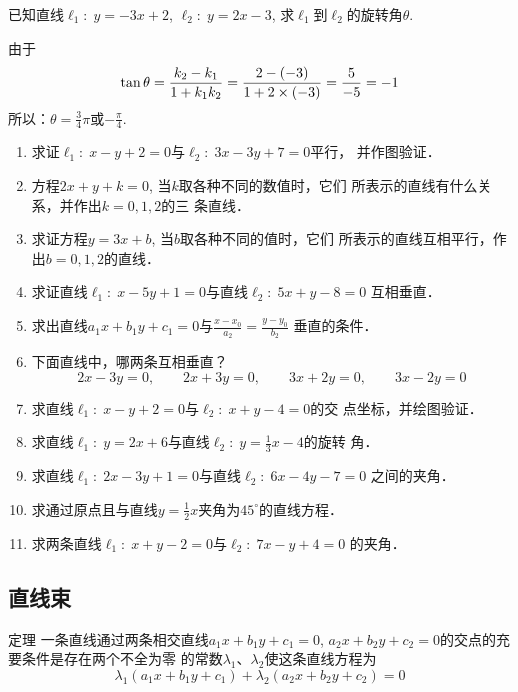 \begin{example}
    已知直线$\ell_1:\; y=-3x+2$, $\ell_2:\; y=2x-3$, 
求$\ell_1$到$\ell_2$的旋转角$\theta$.
\end{example}

\begin{solution}
由于
\[\tan\theta=\dfrac{k_2-k_1}{1+k_1k_2}=\dfrac{2-(-3)}{1+2\times (-3)}=\dfrac{5}{-5}=-1\]
所以：$\theta=\frac{3}{4}\pi$或$-\frac{\pi}{4}$.
\end{solution}

\begin{ex}
\begin{enumerate}
    \item 求证$\ell_1:\; x-y+2=0$与$\ell_2:\;3x-3y+7=0$平行，
    并作图验证．
    \item 方程$2x+y+k=0$, 当$k$取各种不同的数值时，它们
    所表示的直线有什么关系，并作出$k=0,1,2$的三
    条直线．
    \item 求证方程$y=3x+b$, 当$b$取各种不同的值时，它们
    所表示的直线互相平行，作出$b=0,1,2$的直线．
    \item 求证直线$\ell_1:\; x-5y+1=0$与直线$\ell_2:\; 5x+y-8=0$
    互相垂直．
     \item 求出直线$a_1x+b_1y+c_1=0$与$\frac{x-x_0}{a_2}=\frac{y-y_0}{b_2}$
    垂直的条件．
    \item 下面直线中，哪两条互相垂直？
\[2x-3y=0,\qquad 2x+3y=0,\qquad 3x+2y=0,\qquad 3x-2y=0\]

    \item 求直线$\ell_1:\; x-y+2=0$与$\ell_2:\; x+y-4=0$的交
    点坐标，并绘图验证．
    \item 求直线$\ell_1:\; y=2x+6$与直线$\ell_2:\; y=\frac{1}{3}x-4$的旋转
    角．
\item 求直线$\ell_1:\; 2x-3y+1=0$与直线$\ell_2:\; 6x-4y-7=0$
之间的夹角．
\item 求通过原点且与直线$y=\frac{1}{2}x$夹角为$45^{\circ}$的直线方程．
\item 求两条直线$\ell_1:\; x+y-2=0$与$\ell_2:\; 7x-y+4=0$
的夹角．
\end{enumerate}
\end{ex}


\subsection{直线束}



\begin{blk}
    {定理} 一条直线通过两条相交直线$a_1x+b_1y+c_1=0$, 
$a_2x+b_2y+c_2=0$的交点的充要条件是存在两个不全为零
的常数$\lambda_1$、$\lambda_2$使这条直线方程为
\begin{equation}
    \lambda_1(a_1x+b_1y+c_1)+\lambda_2(a_2x+b_2y+c_2)=0
\end{equation}
\end{blk}

